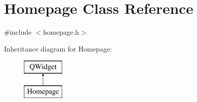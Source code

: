 \hypertarget{class_homepage}{}\section{Homepage Class Reference}
\label{class_homepage}


{\ttfamily \#include $<$homepage.\+h$>$}

Inheritance diagram for Homepage\+:\begin{figure}[H]
\begin{center}
\leavevmode
\includegraphics[height=2.000000cm]{class_homepage}
\end{center}
\end{figure}

